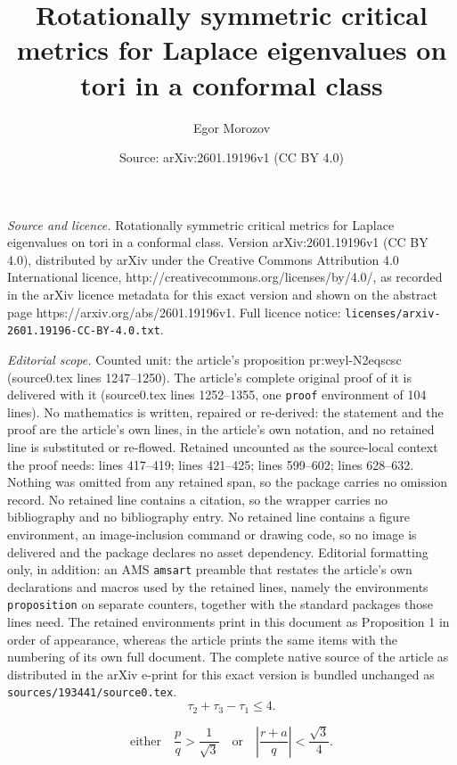 \documentclass[10pt,a4paper]{amsart}
\title{Rotationally symmetric critical metrics for Laplace eigenvalues on tori in a conformal class}
\author{Egor Morozov}
\date{Source: arXiv:2601.19196v1 (CC BY 4.0)}
\begin{document}
\maketitle

\noindent\emph{Source and licence.} Rotationally symmetric critical metrics for Laplace eigenvalues on tori in a conformal class. Version arXiv:2601.19196v1 (CC BY 4.0), distributed by arXiv under the Creative Commons Attribution 4.0 International licence, http://creativecommons.org/licenses/by/4.0/, as recorded in the arXiv licence metadata for this exact version and shown on the abstract page https://arxiv.org/abs/2601.19196v1. Full licence notice: \texttt{licenses/arxiv-2601.19196-CC-BY-4.0.txt}.\par\smallskip

\noindent\textit{Editorial scope.} Counted unit: the article's proposition pr:weyl-N2eqscsc (source0.tex lines 1247--1250). The article's complete original proof of it is delivered with it (source0.tex lines 1252--1355, one \texttt{proof} environment of 104 lines). No mathematics is written, repaired or re-derived: the statement and the proof are the article's own lines, in the article's own notation, and no retained line is substituted or re-flowed.  Retained uncounted as the source-local context the proof needs: lines 417--419; lines 421--425; lines 599--602; lines 628--632.  Nothing was omitted from any retained span, so the package carries no omission record.  No retained line contains a citation, so the wrapper carries no bibliography and no bibliography entry.  No retained line contains a figure environment, an image-inclusion command or drawing code, so no image is delivered and the package declares no asset dependency.  Editorial formatting only, in addition: an AMS \texttt{amsart} preamble that restates the article's own declarations and macros used by the retained lines, namely the environments \texttt{proposition} on separate counters, together with the standard packages those lines need.  The retained environments print in this document as Proposition 1 in order of appearance, whereas the article prints the same items with the numbering of its own full document.  The complete native source of the article as distributed in the arXiv e-print for this exact version is bundled unchanged as \texttt{sources/193441/source0.tex}.
\begin{equation}\label{eq:intro-N2eqsc}
\tau_2+\tau_3-\tau_1\le 4.
\end{equation}

\begin{equation}\label{eq:intro-N2eqscsc}
\text{either}\quad
\frac{p}q>\frac{1}{\sqrt 3}\quad\text{or}\quad
\left|\frac{r+a}q\right|<\frac{\sqrt 3}4.
\end{equation}
\end{document}
